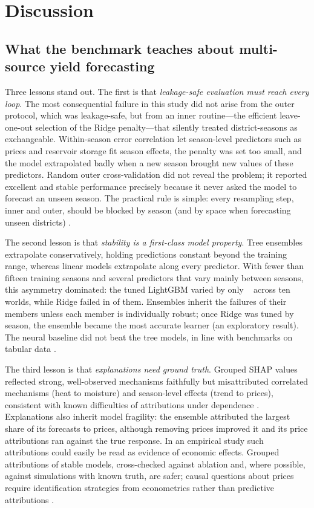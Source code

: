\section{Discussion}\label{sec:discussion}

\subsection{What the benchmark teaches about multi-source yield forecasting}
Three lessons stand out. The first is that \emph{leakage-safe evaluation must reach every loop}. The most consequential failure in this study did not arise from the outer protocol, which was leakage-safe, but from an inner routine---the efficient leave-one-out selection of the Ridge penalty---that silently treated district-seasons as exchangeable. Within-season error correlation let season-level predictors such as prices and reservoir storage fit season effects, the penalty was set too small, and the model extrapolated badly when a new season brought new values of these predictors. Random outer cross-validation did not reveal the problem; it reported excellent and stable performance precisely because it never asked the model to forecast an unseen season. The practical rule is simple: every resampling step, inner and outer, should be blocked by season (and by space when forecasting unseen districts) \citep{roberts2017cross,bergmeir2012use}.

The second lesson is that \emph{stability is a first-class model property}. Tree ensembles extrapolate conservatively, holding predictions constant beyond the training range, whereas linear models extrapolate along every predictor. With fewer than fifteen training seasons and several predictors that vary mainly between seasons, this asymmetry dominated: the tuned LightGBM varied by only \repSdLGB~\kgrai{} across ten worlds, while Ridge failed in \repFailRidge{} of them. Ensembles inherit the failures of their members unless each member is individually robust; once Ridge was tuned by season, the ensemble became the most accurate learner (an exploratory result). The neural baseline did not beat the tree models, in line with benchmarks on tabular data \citep{grinsztajn2022why,shwartz2022tabular}.

The third lesson is that \emph{explanations need ground truth}. Grouped SHAP values reflected strong, well-observed mechanisms faithfully but misattributed correlated mechanisms (heat to moisture) and season-level effects (trend to prices), consistent with known difficulties of attributions under dependence \citep{aas2021explaining,hooker2021unrestricted}. Explanations also inherit model fragility: the ensemble attributed the largest share of its forecasts to prices, although removing prices improved it and its price attributions ran against the true response. In an empirical study such attributions could easily be read as evidence of economic effects. Grouped attributions of stable models, cross-checked against ablation and, where possible, against simulations with known truth, are safer; causal questions about prices require identification strategies from econometrics rather than predictive attributions \citep{wooldridge2010econometric}.

